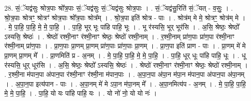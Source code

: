 \documentclass[17pt]{extarticle}
\begin{document}
28. सं॒ॅयद्व॑सुः श्रोत्र॒पाः श्रो᳚त्र॒पाः सं॒ॅयद्व॑सुः सं॒ॅयद्व॑सुः श्रोत्र॒पाः । . सं॒ॅयद्व॑सु॒रिति॑ सं॒ॅयत् - व॒सुः॒ । . श्रो॒त्र॒पाः श्रोत्रꣳ॒॒ श्रोत्रꣳ॑ श्रोत्र॒पाः श्रो᳚त्र॒पाः श्रोत्र᳚म् । . श्रो॒त्र॒पा इति॑ श्रोत्र - पाः । . श्रोत्र॑म् मे मे॒ श्रोत्रꣳ॒॒ श्रोत्र॑म् मे । . मे॒ पा॒हि॒ पा॒हि॒ मे॒ मे॒ पा॒हि॒ । . पा॒हि॒ भूर् भूः पा॑हि पाहि॒ भूः । . भू र॑स्यसि॒ भूर् भूर॑सि । . अ॒सि॒ श्रेष्ठः॒ श्रेष्ठो᳚ ऽस्यसि॒ श्रेष्ठः॑ । . श्रेष्ठो॑ रश्मी॒नाꣳ र॑श्मी॒नाꣳ श्रेष्ठः॒ श्रेष्ठो॑ रश्मी॒नाम् । . र॒श्मी॒नाम् प्रा॑ण॒पाः प्रा॑ण॒पा र॑श्मी॒नाꣳ र॑श्मी॒नाम् प्रा॑ण॒पाः । . प्रा॒ण॒पाः प्रा॒णम् प्रा॒णम् प्रा॑ण॒पाः प्रा॑ण॒पाः प्रा॒णम् । . प्रा॒ण॒पा इति॑ प्राण - पाः । . प्रा॒णम् मे॑ मे प्रा॒णम् प्रा॒णम् मे᳚ । . प्रा॒णमिति॑ प्र - अ॒नम् । . मे॒ पा॒हि॒ पा॒हि॒ मे॒ मे॒ पा॒हि॒ । . पा॒हि॒ धूर् धूः पा॑हि पाहि॒ धूः । . धू र॑स्यसि॒ धूर् धूर॑सि । . अ॒सि॒ श्रेष्ठः॒ श्रेष्ठो᳚ ऽस्यसि॒ श्रेष्ठः॑ । . श्रेष्ठो॑ रश्मी॒नाꣳ र॑श्मी॒नाꣳ श्रेष्ठः॒ श्रेष्ठो॑ रश्मी॒नाम् । . र॒श्मी॒ना म॑पान॒पा अ॑पान॒पा र॑श्मी॒नाꣳ र॑श्मी॒ना म॑पान॒पाः । . अ॒पा॒न॒पा अ॑पा॒न म॑पा॒न म॑पान॒पा अ॑पान॒पा अ॑पा॒नम् । . अ॒पा॒न॒पा इत्य॑पान - पाः । . अ॒पा॒नम् मे॑ मे ऽपा॒न म॑पा॒नम् मे᳚ । . अ॒पा॒नमित्य॑प - अ॒नम् । . मे॒ पा॒हि॒ पा॒हि॒ मे॒ मे॒ पा॒हि॒ । . पा॒हि॒ यो यः पा॑हि पाहि॒ यः । . यो नो॑ नो॒ यो यो नः॑ । \newline
\end{document}
